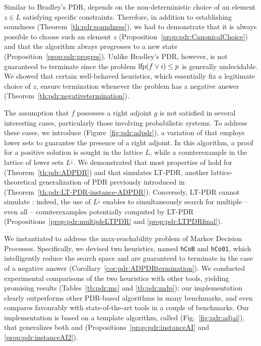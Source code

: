 Similar to Bradley's PDR, {\APDR{}} depends on the non-deterministic choice of an element $z\in L$ satisfying specific constraints. Therefore, in addition to establishing soundness (Theorem~\ref{th:pdr:soundness}), we had to demonstrate that it is always possible to choose such an element $z$ (Proposition~\ref{prop:pdr:CanonicalChoice}) and that the algorithm always progresses to a new state (Proposition~\ref{prop:pdr:progres}). Unlike Bradley's PDR, however, {\APDR{}} is not guaranteed to terminate since the problem $\text{lfp}(f\lor i) \le p$ is generally undecidable. We showed that certain well-behaved heuristics, which essentially fix a legitimate choice of $z$, ensure termination whenever the problem has a negative answer (Theorem~\ref{th:pdr:negativetermination}).

The assumption that $f$ possesses a right adjoint $g$ is not satisfied in several interesting cases, particularly those involving probabilistic systems. To address these cases, we introduce \ADPDR{} (Figure~\ref{fig:pdr:adpdr}), a variation of \APDR{} that employs lower sets to guarantee the presence of a right adjoint. In this algorithm, a proof for a positive solution is sought in the lattice $L$, while a counterexample in the lattice of lower sets $L^\downarrow$. We demonstrated that most properties of \APDR{} hold for \ADPDR{} (Theorem~\ref{th:pdr:ADPDR}) and that \ADPDR{} simulates LT-PDR, another lattice-theoretical generalization of PDR previously introduced in~\cite{KUKSH22} (Theorem~\ref{th:pdr:LT-PDR-instance-ADPDR}). Conversely, LT-PDR cannot simulate \ADPDR{}: indeed, the use of $L^\downarrow$ enables \ADPDR{} to simultaneously search for multiple -- even all -- counterexamples potentially computed by LT-PDR (Propositions~\ref{prop:pdr:multipleLTPDR} and \ref{prop:pdr:LTPDRfinal}).

We instantiated \ADPDR{} to address the max-reachability problem of Markov Decision Processes. Specifically, we devised two heuristics, named \verb|hCoB| and \verb|hCo01|, which intelligently reduce the search space and are guaranteed to terminate in the case of a negative answer (Corollary~\ref{cor:pdr:ADPDRtermination}). We conducted experimental comparisons of the two heuristics with other tools, yielding promising results (Tables~\ref{tb:pdr:mc} and \ref{tb:pdr:mdp}): our implementation clearly outperforms other PDR-based algorithms in many benchmarks, and even compares favourably with state-of-the-art tools in a couple of benchmarks. Our implementation is based on a template algorithm, called \APDRAI{} (Fig.~\ref{fig:pdr:adjai}), that generalizes both \APDR{} and \ADPDR{} (Propositions~\ref{prop:pdr:instanceAI} and \ref{prop:pdr:instanceAI2}).
